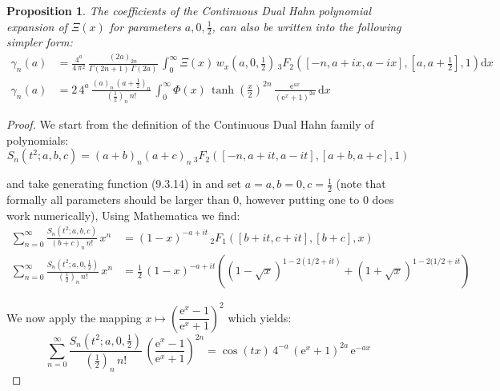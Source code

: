 \documentclass[a4paper,11pt,twoside]{amsart}
\newtheorem{proposition}[theorem]{Proposition}
\begin{document}
\begin{proposition}
The coefficients of the Continuous Dual Hahn polynomial expansion of $\Xi(x)$ for parameters $a,0,\frac12$, can also be written into the following simpler form:   
\begin{align}
  \gamma_n(a) &= \frac{4^a}{4\,\pi^2}\,\frac{(2a)_{2n}}{\Gamma(2n+1)\,\Gamma(2a)}\,\int_{0}^{\infty} \Xi(x)\,w_x\left(a,0,\frac12\right)\,{}_3F_2\left([-n,a+ix,a-ix],\left[a,a+\frac12\right],1\right)\mathrm{d}x \\
  \gamma_n(a) &= 2\,4^a\,\frac{(a)_n\,\left(a+\frac12\right)_n}{\left(\frac12\right)_n\,n!}\,\int_{0}^{\infty} \Phi(x)\,\tanh\left(\frac{x}{2}\right)^{2n}\,\frac{\mathrm{e}^{ax}}{(\mathrm{e}^x+1)^{2a}}\,\mathrm{d}x
\end{align}
\end{proposition}
\begin{proof}
We start from the definition of the Continuous Dual Hahn family of polynomials:
\begin{equation}
 S_n(t^2;a,b,c) = (a+b)_n(a+c)_n\, {}_3F_2([-n,a+it, a- it], [a+b, a+c], 1) 
\end{equation}

and take generating function (9.3.14) in \cite{koe} and set $a=a,b=0,c=\frac12$ (note that formally all parameters should be larger than $0$, however putting one to $0$ does work numerically), Using Mathematica we find:
\begin{align}
 \sum_{n=0}^\infty \frac{S_n(t^2;a,b,c)}{(b+c)_n\,n!}\, x^n &= (1-x)^{-a+it}\,{}_2F_1\left([b+it, c+it],[b+c], x\right) \\
\sum_{n=0}^\infty \frac{S_n\left(t^2;a,0,\frac12\right)}{\left(\frac12\right)_n\,n!}\,x^n&= \frac12\,(1-x)^{-a+it}\left((1-\sqrt{x})^{1-2(1/2+it)}+(1+\sqrt{x})^{1-2(1/2+it}\right)
\end{align}

We now apply the mapping $x \mapsto \left(\dfrac{\textrm{e}^{x}-1}{\textrm{e}^{x}+1}\right)^2$ which yields:
\begin{equation}
 \sum_{n=0}^\infty \frac{S_n\left(t^2;a,0,\frac12\right)}{\left(\frac12\right)_n\,n!}\, \left(\frac{\textrm{e}^{x}-1}{\textrm{e}^{x}+1}\right)^{2n} = \cos(tx)\,4^{-a}\,(\mathrm{e}^x+1)^{2a}\,\mathrm{e}^{-ax}
\end{equation}


\end{proof}
\end{document}
